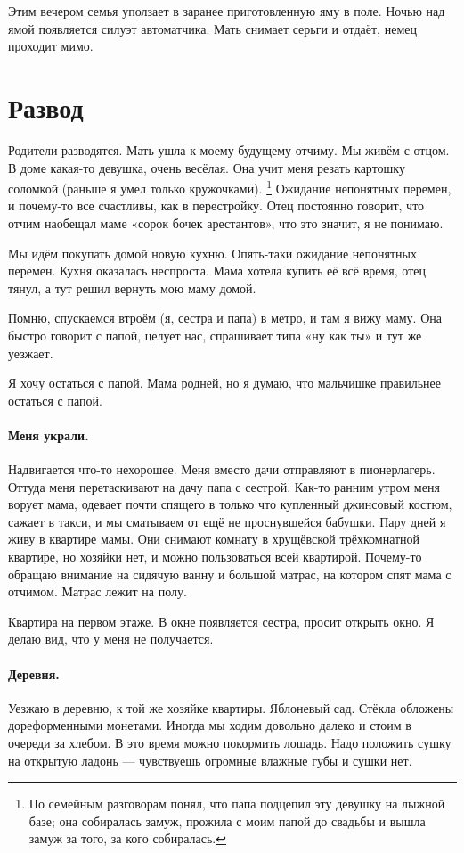 \documentclass{book}
\begin{document}
Этим вечером семья уползает в заранее приготовленную яму в поле.
Ночью над ямой появляется силуэт автоматчика.
Мать снимает серьги и отдаёт, немец проходит мимо.


\section*{Развод}

Родители разводятся.
Мать ушла к моему будущему отчиму.
Мы живём с отцом.
В доме какая-то девушка, очень весёлая.
Она учит меня резать картошку соломкой (раньше я умел только кружочками).%
\footnote{По семейным разговорам понял, что папа подцепил эту девушку на лыжной базе;
она собиралась замуж, прожила с моим папой до свадьбы и вышла замуж за того, за кого собиралась.}
Ожидание непонятных перемен, и почему-то все счастливы, как в перестройку.
Отец постоянно говорит, что отчим наобещал маме «сорок бочек арестантов», что это значит, я не понимаю.

Мы идём покупать домой новую кухню.
Опять-таки ожидание непонятных перемен.
Кухня оказалась неспроста.
Мама хотела купить её всё время, отец тянул, а тут решил вернуть мою маму домой.

Помню, спускаемся втроём (я, сестра и папа) в метро, и там я вижу маму.
Она быстро говорит с папой, целует нас, спрашивает типа «ну как ты» и тут же уезжает.

Я хочу остаться с папой.
Мама родней, но я думаю, что мальчишке правильнее остаться с папой.

\paragraph{Меня украли.}
Надвигается что-то нехорошее.
Меня вместо дачи отправляют в пионерлагерь.
Оттуда меня перетаскивают на дачу папа с сестрой.
Как-то ранним утром меня ворует мама, одевает почти спящего в только что купленный джинсовый костюм, сажает в такси, и мы сматываем от ещё не проснувшейся бабушки.
Пару дней я живу в квартире мамы.
Они снимают комнату в хрущёвской трёхкомнатной квартире, но хозяйки нет, и можно пользоваться всей квартирой.
Почему-то обращаю внимание на сидячую ванну и большой матрас, на котором спят мама с отчимом.
Матрас лежит на полу.

Квартира на первом этаже.
В окне появляется сестра, просит открыть окно.
Я делаю вид, что у меня не получается.

\paragraph{Деревня.}
Уезжаю в деревню, к той же хозяйке квартиры.
Яблоневый сад.
Стёкла обложены дореформенными монетами.
Иногда мы ходим довольно далеко и стоим в очереди за хлебом.
В это время можно покормить лошадь.
Надо положить сушку на  открытую ладонь ---
чувствуешь огромные влажные губы и сушки нет.
\end{document}

